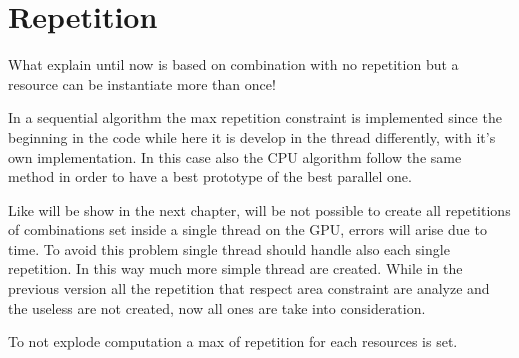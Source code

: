 \section{Repetition}

What explain until now is based on combination with no repetition but a resource can be instantiate more than once!

In a sequential algorithm the max repetition constraint is implemented since the beginning in the code while here it is develop in the thread differently, with it's own implementation. In this case also the CPU algorithm follow the same method in order to have a best prototype of the best parallel one.

Like will be show in the next chapter, will be not possible to create all repetitions of combinations set inside a single thread on the GPU, errors will arise due to time. To avoid this problem single thread should handle also each single repetition. In this way much more simple thread are created. While in the previous version all the repetition that respect area constraint are analyze and the useless are not created, now all ones are take into consideration.

To not explode computation a max of repetition for each resources is set.